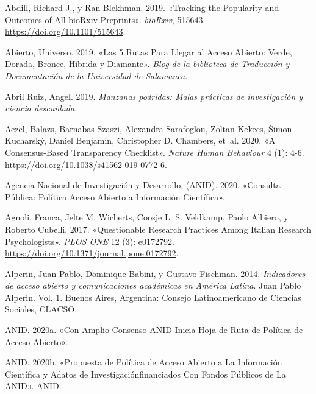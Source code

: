\documentclass[
  spanish,
  a4paper,
  oneside]{scrbook}
\newlength{\cslhangindent}
\newenvironment{CSLReferences}[2] %
 {\begin{list}{}{%
  \setlength{\itemindent}{0pt}
  \setlength{\leftmargin}{0pt}
  \setlength{\parsep}{0pt}
  \ifodd #1
   \setlength{\leftmargin}{\cslhangindent}
   \setlength{\itemindent}{-1\cslhangindent}
  \fi
  \setlength{\itemsep}{#2\baselineskip}}}
 {\end{list}}
\begin{document}

\label{refs}
\begin{CSLReferences}{1}{0}
Abdill, Richard J., y Ran Blekhman. 2019. {«Tracking the Popularity and
Outcomes of All {bioRxiv} Preprints»}. \emph{bioRxiv}, 515643.
\url{https://doi.org/10.1101/515643}.

Abierto, Universo. 2019. {«Las 5 Rutas Para Llegar al Acceso Abierto:
Verde, Dorada, Bronce, H{í}brida y Diamante»}. \emph{Blog de la
biblioteca de Traducci{ó}n y Documentaci{ó}n de la Universidad de
Salamanca}.

Abril Ruiz, Angel. 2019. \emph{{Manzanas podridas: Malas pr{á}cticas de
investigaci{ó}n y ciencia descuidada}}.

Aczel, Balazs, Barnabas Szaszi, Alexandra Sarafoglou, Zoltan Kekecs,
Šimon Kucharský, Daniel Benjamin, Christopher D. Chambers, et~al. 2020.
{«A Consensus-Based Transparency Checklist»}. \emph{Nature Human
Behaviour} 4 (1): 4-6. \url{https://doi.org/10.1038/s41562-019-0772-6}.

Agencia Nacional de Investigación y Desarrollo, (ANID). 2020. {«Consulta
{P{ú}blica}: {Pol{í}tica Acceso Abierto} a {Informaci{ó}n
Cient{í}fica}»}.

Agnoli, Franca, Jelte M. Wicherts, Coosje L. S. Veldkamp, Paolo Albiero,
y Roberto Cubelli. 2017. {«Questionable Research Practices Among Italian
Research Psychologists»}. \emph{PLOS ONE} 12 (3): e0172792.
\url{https://doi.org/10.1371/journal.pone.0172792}.

Alperin, Juan Pablo, Dominique Babini, y Gustavo Fischman. 2014.
\emph{{Indicadores de acceso abierto y comunicaciones acad{é}micas en
Am{é}rica Latina}}. Juan Pablo Alperin. Vol. 1. Buenos Aires, Argentina:
Consejo Latinoamericano de Ciencias Sociales, CLACSO.

ANID. 2020a. {«Con {Amplio Consenso ANID Inicia Hoja} de {Ruta} de
{Pol{í}tica} de {Acceso Abierto}»}.

ANID. 2020b. {«Propuesta de {Pol{í}tica} de Acceso Abierto a La
Informaci{ó}n Cient{í}fica y Adatos de Investigaci{ó}nfinanciados Con
Fondos P{ú}blicos de La {ANID}»}. ANID.


\end{CSLReferences}
\end{document}
